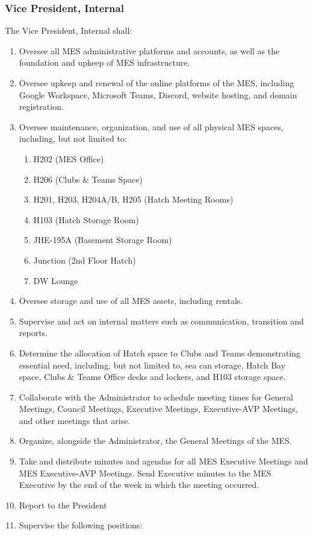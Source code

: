 \hypertarget{vice-president-internal}{%
 \subsubsection{Vice President,
  Internal}
 \label{vice-president-internal}}
The Vice President, Internal shall:

\begin{enumerate}
 \item
  Oversee all MES administrative platforms and accounts, as well as the
  foundation and upkeep of MES infrastructure.
 \item
  Oversee upkeep and renewal of the online platforms of the MES,
  including Google Workspace, Microsoft Teams, Discord, website hosting,
  and domain registration.
 \item
  Oversee maintenance, organization, and use of all physical MES spaces,
  including, but not limited to:

  \begin{enumerate}
   \item
    H202 (MES Office)
   \item
    H206 (Clubs \& Teams Space)
   \item
    H201, H203, H204A/B, H205 (Hatch Meeting Rooms)
   \item
    H103 (Hatch Storage Room)
   \item
    JHE-195A (Basement Storage Room)
   \item
    Junction (2nd Floor Hatch)
   \item
    DW Lounge
  \end{enumerate}
 \item
  Oversee storage and use of all MES assets, including rentals.
 \item
  Supervise and act on internal matters such as communication,
  transition and reports.
 \item
  Determine the allocation of Hatch space to Clubs and Teams
  demonstrating essential need, including, but not limited to, sea can
  storage, Hatch Bay space, Clubs \& Teams Office desks and lockers, and
  H103 storage space.
 \item
  Collaborate with the Administrator to schedule meeting times for
  General Meetings, Council Meetings, Executive Meetings, Executive-AVP
  Meetings, and other meetings that arise.
 \item
  Organize, alongside the Administrator, the General Meetings of the
  MES.
 \item
  Take and distribute minutes and agendas for all MES Executive Meetings
  and MES Executive-AVP Meetings. Send Executive minutes to the MES
  Executive by the end of the week in which the meeting occurred.
 \item
  Report to the President
 \item
  Supervise the following positions:


\end{enumerate}
